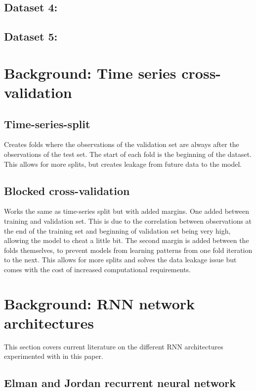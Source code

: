 \documentclass[conference]{IEEEtran}
\begin{document}
\subsection{Dataset 4: }

\subsection{Dataset 5: }

\section{Background: Time series cross-validation}

\subsection{Time-series-split}

Creates folds where the observations of the validation set are always after the observations of the test set. The start of each fold is the beginning of the dataset. This allows for more splits, but creates leakage from future data to the model.

\subsection{Blocked cross-validation}

Works the same as time-series split but with added margins. One added between training and validation set. This is due to the correlation between observations at the end of the training set and beginning of validation set being very high, allowing the model to cheat a little bit. The second margin is added between the folds themselves, to prevent models from learning patterns from one fold iteration to the next. This allows for more splits and solves the data leakage issue but comes with the cost of increased computational requirements.

\section{Background: RNN network architectures}

This section covers current literature on the different RNN architectures experimented with in this paper.

\subsection{Elman and Jordan recurrent neural network}
\end{document}
